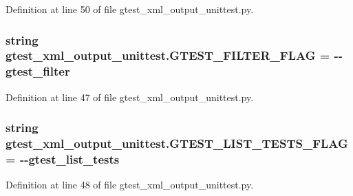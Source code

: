 Definition at line 50 of file gtest\+\_\+xml\+\_\+output\+\_\+unittest.\+py.

\subsubsection[{\texorpdfstring{G\+T\+E\+S\+T\+\_\+\+F\+I\+L\+T\+E\+R\+\_\+\+F\+L\+AG}{GTEST_FILTER_FLAG}}]{\setlength{\rightskip}{0pt plus 5cm}string gtest\+\_\+xml\+\_\+output\+\_\+unittest.\+G\+T\+E\+S\+T\+\_\+\+F\+I\+L\+T\+E\+R\+\_\+\+F\+L\+AG = \textquotesingle{}-\/-\/gtest\+\_\+filter\textquotesingle{}}\hypertarget{namespacegtest__xml__output__unittest_ab914acfbfbc3f6f5ee3f1e83134c7204}{}\label{namespacegtest__xml__output__unittest_ab914acfbfbc3f6f5ee3f1e83134c7204}


Definition at line 47 of file gtest\+\_\+xml\+\_\+output\+\_\+unittest.\+py.

\subsubsection[{\texorpdfstring{G\+T\+E\+S\+T\+\_\+\+L\+I\+S\+T\+\_\+\+T\+E\+S\+T\+S\+\_\+\+F\+L\+AG}{GTEST_LIST_TESTS_FLAG}}]{\setlength{\rightskip}{0pt plus 5cm}string gtest\+\_\+xml\+\_\+output\+\_\+unittest.\+G\+T\+E\+S\+T\+\_\+\+L\+I\+S\+T\+\_\+\+T\+E\+S\+T\+S\+\_\+\+F\+L\+AG = \textquotesingle{}-\/-\/gtest\+\_\+list\+\_\+tests\textquotesingle{}}\hypertarget{namespacegtest__xml__output__unittest_aafe4dd234e72bbb61f4f34689fbca5c4}{}\label{namespacegtest__xml__output__unittest_aafe4dd234e72bbb61f4f34689fbca5c4}


Definition at line 48 of file gtest\+\_\+xml\+\_\+output\+\_\+unittest.\+py.

